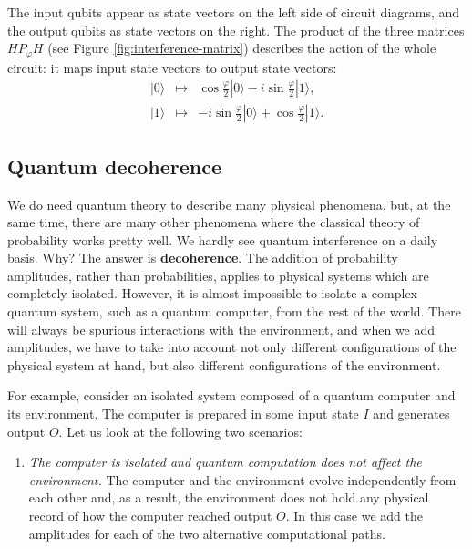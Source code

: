 \documentclass[fleqn]{article}
\providecommand{\tightlist}{%
  \setlength{\itemsep}{0pt}\setlength{\parskip}{0pt}}
\renewcommand{\footnote}[1]{\en{#1}}
\begin{document}
The input qubits appear as state vectors on the left side of circuit diagrams, and the output qubits as state vectors on the right.
The product of the three matrices \(HP_\varphi H\) (see Figure \ref{fig:interference-matrix}) describes the action of the whole circuit: it maps input state vectors to output state vectors\footnote{\(HP_\varphi H =\begin{bmatrix}\cos\frac{\varphi}{2} & -i\sin\frac{\varphi}{2}\\\ -i\sin\frac{\varphi}{2}& \cos\frac{\varphi}{2}\end{bmatrix}\)}:
\[
  \begin{array}{lcr}
    |0\rangle & \longmapsto & \cos\frac{\varphi}{2}|0\rangle - i\sin\frac{\varphi}{2}|1\rangle,
  \\|1\rangle
    & \longmapsto
    &- i\sin\frac{\varphi}{2}|0\rangle + \cos\frac{\varphi}{2}|1\rangle.
  \end{array}
\]

\hypertarget{quantum-decoherence}{%
\subsection{Quantum decoherence}\label{quantum-decoherence}}

We do need quantum theory to describe many physical phenomena, but, at the same time, there are many other phenomena where the classical theory of probability works pretty well.
We hardly see quantum interference on a daily basis.
Why?
The answer is \textbf{decoherence}.
The addition of probability amplitudes, rather than probabilities, applies to physical systems which are completely isolated.
However, it is almost impossible to isolate a complex quantum system, such as a quantum computer, from the rest of the world.
There will always be spurious interactions with the environment, and when we add amplitudes, we have to take into account not only different configurations of the physical system at hand, but also different configurations of the environment.

For example, consider an isolated system composed of a quantum computer and its environment.
The computer is prepared in some input state \(I\) and generates output \(O\).
Let us look at the following two scenarios:

\begin{enumerate}
\def\labelenumi{\arabic{enumi}.}
\tightlist
\item
  \emph{The computer is isolated and quantum computation does not affect the environment.}
  The computer and the environment evolve independently from each other and, as a result, the environment does not hold any physical record of how the computer reached output \(O\).
  In this case we add the amplitudes for each of the two alternative computational paths.
\end{enumerate}
\end{document}
